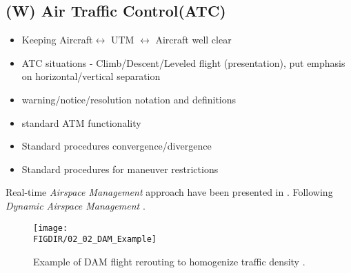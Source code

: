 \subsection{(W) Air Traffic Control(ATC)}\label{sec:AirTrafficControl}
    \begin{itemize}
        \item Keeping Aircraft$\leftrightarrow$ UTM $\leftrightarrow$ Aircraft well clear
        \item ATC situations - Climb/Descent/Leveled flight (presentation), put emphasis on horizontal/vertical separation
        \item warning/notice/resolution notation and definitions
        \item standard ATM functionality
        \item Standard procedures convergence/divergence
        \item Standard procedures for maneuver restrictions
    \end{itemize}
    
    Real-time \emph{Airspace Management} approach have been presented in \cite{gardi2014real}. Following \emph{Dynamic Airspace Management} \cite{gerdes2016dynamic}.
    \begin{figure}[H]
        \centering
        \texttt{[image: \\FIGDIR/02\_02\_DAM\_Example]}
        \caption{Example of DAM flight rerouting to homogenize traffic density \cite{gerdes2016dynamic}.}
        \label{fig:DAMExample}
    \end{figure}


